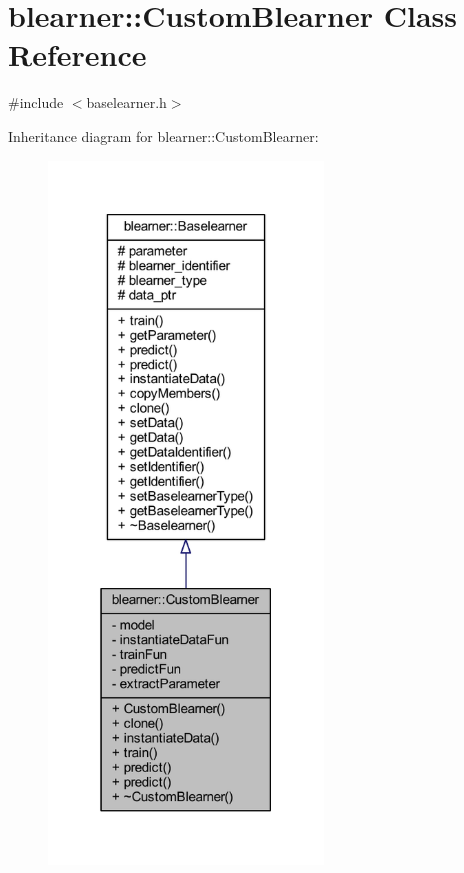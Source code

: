 \hypertarget{classblearner_1_1_custom_blearner}{}\section{blearner\+:\+:Custom\+Blearner Class Reference}
\label{classblearner_1_1_custom_blearner}


{\ttfamily \#include $<$baselearner.\+h$>$}



Inheritance diagram for blearner\+:\+:Custom\+Blearner\+:\nopagebreak
\begin{figure}[H]
\begin{center}
\leavevmode
\includegraphics[width=207pt]{classblearner_1_1_custom_blearner__inherit__graph}
\end{center}
\end{figure}


